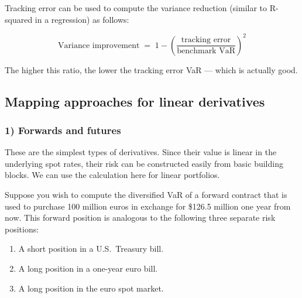 Tracking error can be used to compute the variance reduction (similar to R-squared in a
regression) as follows:

\begin{mrfmlbox}
\[ \text{Variance improvement} \;=\; 1 - \left( \frac{\text{tracking error}}
   {\text{benchmark VaR}} \right)^{\!2} \]
\end{mrfmlbox}

\begin{mrkeybox}
The higher this ratio, the lower the tracking error VaR --- which is actually good.
\end{mrkeybox}


\subsection{Mapping approaches for linear derivatives}

\subsubsection{1) Forwards and futures}
These are the simplest types of derivatives. Since their value is linear in the underlying spot
rates, their risk can be constructed easily from basic building blocks. We can use the
 calculation here for linear portfolios.

\begin{mrexbox}[title={Example --- diversified VaR of a currency forward}]
Suppose you wish to compute the diversified VaR of a forward contract that is used to purchase
100 million euros in exchange for \$126.5 million one year from now. This forward position is
analogous to the following three separate risk positions:
\begin{enumerate}
\item A short position in a U.S.\ Treasury bill.
\item A long position in a one-year euro bill.
\item A long position in the euro spot market.
\end{enumerate}
\end{mrexbox}


